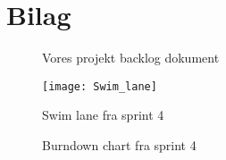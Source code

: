 \section{Bilag}
\begin{figure}
    \caption{Vores projekt backlog dokument}
    \label{fig:projekt-backlog}
\end{figure}
\begin{landscape}
    \begin{figure}[H]
        \texttt{[image: Swim\_lane]}
        \caption{Swim lane fra sprint 4}
        \label{fig:swim-lane}
    \end{figure}
    \begin{figure}[H]
        \caption{Burndown chart fra sprint 4}
        \label{fig:burndown-chart}
    \end{figure}
\end{landscape}

